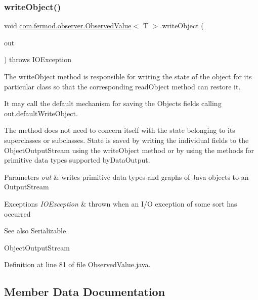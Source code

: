 \subsubsection{\texorpdfstring{writeObject()}{writeObject()}}
{\footnotesize\ttfamily void \mbox{\hyperlink{classcom_1_1fermod_1_1observer_1_1ObservedValue}{com.\+fermod.\+observer.\+Observed\+Value}}$<$ T $>$.write\+Object (\begin{DoxyParamCaption}\item[{Object\+Output\+Stream}]{out }\end{DoxyParamCaption}) throws I\+O\+Exception\hspace{0.3cm}{\ttfamily [private]}}



The {\ttfamily write\+Object} method is responsible for writing the state of the object for its particular class so that the corresponding {\ttfamily read\+Object} method can restore it. 

It may call the default mechanism for saving the Object\textquotesingle{}s fields calling {\ttfamily out.\+default\+Write\+Object}. 

The method does not need to concern itself with the state belonging to its superclasses or subclasses. State is saved by writing the individual fields to the {\ttfamily Object\+Output\+Stream} using the {\ttfamily write\+Object} method or by using the methods for primitive data types supported by{\ttfamily  Data\+Output}.


\begin{DoxyParams}{Parameters}
{\em out} & writes primitive data types and graphs of Java objects to an Output\+Stream \\
\hline
\end{DoxyParams}

\begin{DoxyExceptions}{Exceptions}
{\em I\+O\+Exception} & thrown when an I/O exception of some sort has occurred \\
\hline
\end{DoxyExceptions}
\begin{DoxySeeAlso}{See also}
Serializable 

Object\+Output\+Stream 
\end{DoxySeeAlso}


Definition at line 81 of file Observed\+Value.\+java.



\subsection{Member Data Documentation}
\mbox{\label{classcom_1_1fermod_1_1observer_1_1ObservedValue_ad494135b9a0d52423069327f49e93937}} 
